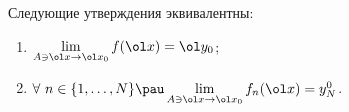 
	 Следующие утверждения эквивалентны:
	 \begin{enumerate}
	   \item $\lim\limits_{A\ni\ol x\to\ol x_0}f(\ol x) = \ol y_0$;
	   \item $\forall \ n\in\{1,\ldots,N\}\pau \lim\limits_{A\ni \ol x\to \ol x_0}f_n(\ol x) = y_N^0$.
	 \end{enumerate}
	 